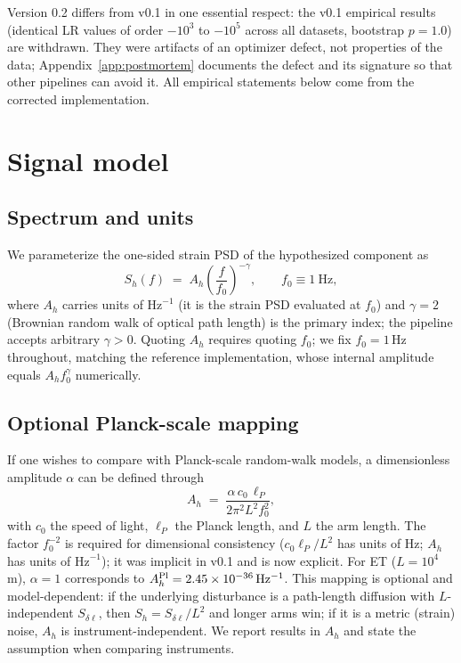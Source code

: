 \documentclass[11pt]{article}
\newcommand{\Ah}{A_h}
\newcommand{\Sh}{S_h}
\begin{document}
Version 0.2 differs from v0.1 in one essential respect: the v0.1 empirical results (identical LR values of order $-10^3$ to $-10^5$ across all datasets, bootstrap $p = 1.0$) are withdrawn. They were artifacts of an optimizer defect, not properties of the data; Appendix~\ref{app:postmortem} documents the defect and its signature so that other pipelines can avoid it. All empirical statements below come from the corrected implementation.

\section{Signal model}
\label{sec:model}

\subsection{Spectrum and units}

We parameterize the one-sided strain PSD of the hypothesized component as
\begin{equation}
\Sh(f) \;=\; \Ah \left(\frac{f}{f_0}\right)^{-\gamma},
\qquad f_0 \equiv 1~\mathrm{Hz},
\label{eq:psd}
\end{equation}
where $\Ah$ carries units of $\mathrm{Hz}^{-1}$ (it is the strain PSD evaluated at $f_0$) and $\gamma = 2$ (Brownian random walk of optical path length) is the primary index; the pipeline accepts arbitrary $\gamma > 0$. Quoting $\Ah$ requires quoting $f_0$; we fix $f_0 = 1$\,Hz throughout, matching the reference implementation, whose internal amplitude equals $\Ah f_0^{\gamma}$ numerically.

\subsection{Optional Planck-scale mapping}

If one wishes to compare with Planck-scale random-walk models, a dimensionless amplitude $\alpha$ can be defined through
\begin{equation}
\Ah \;=\; \frac{\alpha\, c_0\, \ell_P}{2\pi^2 L^2 f_0^{2}},
\label{eq:planck}
\end{equation}
with $c_0$ the speed of light, $\ell_P$ the Planck length, and $L$ the arm length. The factor $f_0^{-2}$ is required for dimensional consistency ($c_0 \ell_P / L^2$ has units of Hz; $\Ah$ has units of $\mathrm{Hz}^{-1}$); it was implicit in v0.1 and is now explicit. For ET ($L = 10^4$\,m), $\alpha = 1$ corresponds to $\Ah^{\rm Pl} = 2.45\times10^{-36}\,\mathrm{Hz^{-1}}$. This mapping is optional and model-dependent: if the underlying disturbance is a path-length diffusion with $L$-independent $S_{\delta \ell}$, then $\Sh = S_{\delta\ell}/L^2$ and longer arms win; if it is a metric (strain) noise, $\Ah$ is instrument-independent. We report results in $\Ah$ and state the assumption when comparing instruments.
\end{document}
